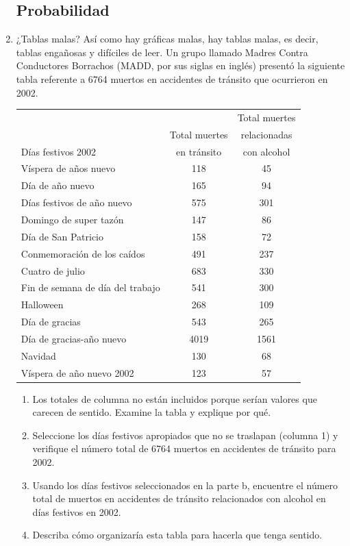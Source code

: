 \documentclass[fleqn,twocolum]{article}
\begin{document}
\begin{enumerate}
\subsection*{Probabilidad}
\item ¿Tablas malas? Así como hay gráficas malas, hay tablas malas, es decir, tablas engañosas y difíciles de leer. Un grupo llamado  Madres Contra Conductores Borrachos (MADD, por sus siglas en inglés) presentó la siguiente tabla referente a 6764 muertos en accidentes de tránsito que ocurrieron en 2002.
\newpage
\begin{center}
\begin{tabular}{lcc}
 &  & Total muertes \\ 
 & Total muertes & relacionadas \\ 
\hspace{15pt} Días festivos 2002 & en tránsito & con alcohol \\ 
\hline 
Víspera de años nuevo & 118 & 45 \\ 
Día de año nuevo & 165 & 94 \\ 
Días festivos de año nuevo & 575 & 301 \\ 
Domingo de super tazón & 147 & 86 \\ 
Día de San Patricio & 158 & 72 \\ 
Conmemoración de los caídos & 491 & 237 \\ 
Cuatro de julio & 683 & 330 \\ 
Fin de semana de día del trabajo & 541 & 300 \\ 
Halloween & 268 & 109 \\ 
Día de gracias & 543 & 265 \\ 
Día de gracias-año nuevo & 4019 & 1561 \\ 
Navidad & 130 & 68 \\ 
Víspera de año nuevo 2002 & 123 & 57 \\ 
\hline 
\end{tabular}
\end{center}
\begin{enumerate}
\item Los totales de columna no están incluidos porque
serían valores que carecen de sentido. Examine la
tabla y explique por qué.\noanswer
\item Seleccione los días festivos apropiados que no se
traslapan (columna 1) y verifique el número total
de 6764 muertos en accidentes de tránsito para
2002.\noanswer
\item Usando los días festivos seleccionados en la parte b, encuentre el número total de muertos en accidentes de tránsito relacionados con alcohol en
días festivos en 2002.\noanswer
\item Describa cómo organizaría esta tabla para hacerla que tenga sentido.\noanswer
\end{enumerate}
\end{enumerate}
\end{document}
